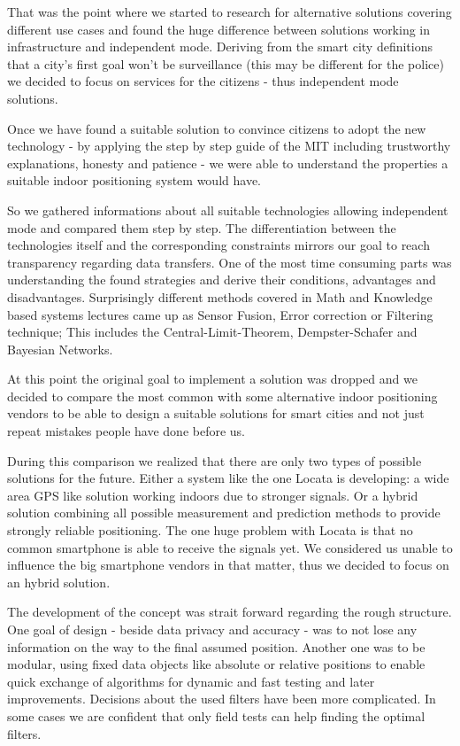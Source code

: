 That was the point where we started to research for alternative solutions covering different use cases and found the huge difference between solutions working in infrastructure and independent mode. Deriving from the smart city definitions that a city's first goal won't be surveillance (this may be different for the police) we decided to focus on services for the citizens - thus independent mode solutions.

Once we have found a suitable solution to convince citizens to adopt the new technology - by applying the step by step guide of the MIT including trustworthy explanations, honesty and patience - we were able to understand the properties a suitable indoor positioning system would have. 

So we gathered informations about all suitable technologies allowing independent mode and compared them step by step. The differentiation between the technologies itself and the corresponding constraints mirrors our goal to reach transparency regarding data transfers. One of the most time consuming parts was understanding the found strategies and derive their conditions, advantages and disadvantages. Surprisingly different methods covered in Math and Knowledge based systems  lectures came up as Sensor Fusion, Error correction or Filtering technique; This includes the Central-Limit-Theorem, Dempster-Schafer and Bayesian Networks.

At this point the original goal to implement a solution was dropped and we decided to compare the most common with some alternative indoor positioning vendors to be able to design a suitable solutions for smart cities and not just repeat mistakes people have done before us. 

During this comparison we realized that there are only two types of possible solutions for the future. Either a system like the one Locata is developing: a wide area GPS like solution working indoors due to stronger signals. Or a hybrid solution combining all possible measurement and prediction methods to provide strongly reliable positioning. The one huge problem with Locata is that no common smartphone is able to receive the signals yet. We considered us unable to influence the big smartphone vendors in that matter, thus we decided to focus on an hybrid solution.

The development of the concept was strait forward regarding the rough structure. One goal of design - beside data privacy and accuracy - was to not lose any information on the way to the final assumed position. Another one was to be modular, using fixed data objects like absolute or relative positions to enable quick exchange of algorithms for dynamic and fast testing and later improvements. Decisions about the used filters have been more complicated. In some cases we are confident that only field tests can help finding the optimal filters.

